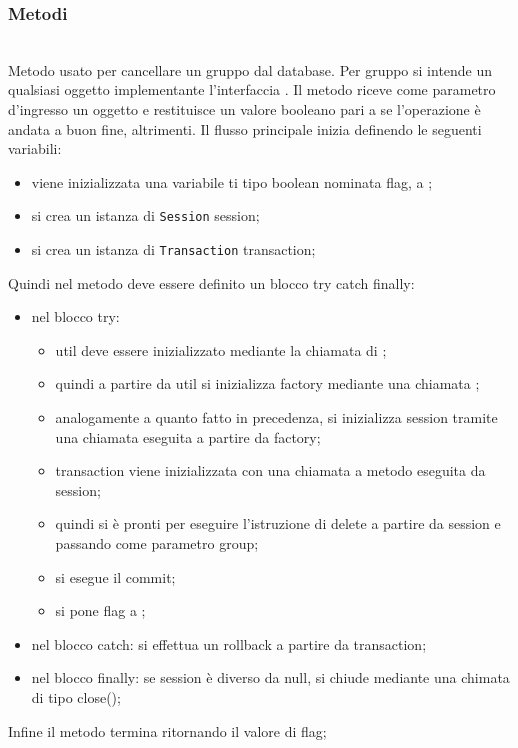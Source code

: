 \subsubsection*{Metodi}

\begin{description}
	\item{}\\
	Metodo usato per cancellare un gruppo dal database. Per gruppo si intende un qualsiasi oggetto implementante l'interfaccia . Il metodo riceve come parametro d'ingresso un oggetto  e restituisce un valore booleano  pari a  se l'operazione è andata a buon fine,  altrimenti. Il flusso principale inizia definendo le seguenti variabili:
	\begin{itemize}
		\item viene inizializzata una variabile ti tipo boolean nominata flag, a ;
		\item si crea un istanza di \texttt{Session} session;
		\item si crea un istanza di \texttt{Transaction} transaction;
	\end{itemize}
	Quindi nel metodo deve essere definito un blocco try catch finally:
	\begin{itemize}
		\item nel blocco try:
		\begin{itemize}
			\item util deve essere inizializzato mediante la chiamata  di ;
			\item quindi a partire da util si inizializza factory mediante una chiamata ;
			\item analogamente a quanto fatto in precedenza, si inizializza session tramite una chiamata  eseguita a partire da factory;
			\item transaction viene inizializzata con una chiamata a metodo  eseguita da session;
			\item quindi si è pronti per eseguire l'istruzione di delete a partire da session e passando come parametro group;
			\item si esegue il commit;
			\item si pone flag a ;
		\end{itemize}
		\item nel blocco catch: si effettua un rollback a partire da transaction;
		\item nel blocco finally: se session è diverso da null, si chiude mediante una chimata di tipo close();
	\end{itemize}
	Infine il metodo termina ritornando il valore di flag;
	

\end{description}
